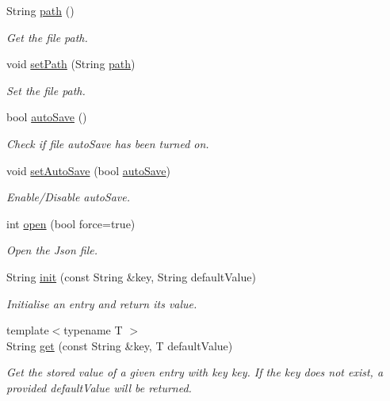 \begin{DoxyCompactItemize}
String \mbox{\hyperlink{class_nv_mem_json_file_dict_a9cf7220ebdf23d391790506e165e14d7}{path}} ()
\begin{DoxyCompactList}\small\item\em Get the file path. \end{DoxyCompactList}\item 
void \mbox{\hyperlink{class_nv_mem_json_file_dict_a7b4c2899c4ed3cf1e33d69cbec83efe7}{set\+Path}} (String \mbox{\hyperlink{class_nv_mem_json_file_dict_a9cf7220ebdf23d391790506e165e14d7}{path}})
\begin{DoxyCompactList}\small\item\em Set the file path. \end{DoxyCompactList}\item 
bool \mbox{\hyperlink{class_nv_mem_json_file_dict_aa021fe277e0529adef47b80f82864f65}{auto\+Save}} ()
\begin{DoxyCompactList}\small\item\em Check if file auto\+Save has been turned on. \end{DoxyCompactList}\item 
void \mbox{\hyperlink{class_nv_mem_json_file_dict_a4896c91e42b5d444825417850e2f0f90}{set\+Auto\+Save}} (bool \mbox{\hyperlink{class_nv_mem_json_file_dict_aa021fe277e0529adef47b80f82864f65}{auto\+Save}})
\begin{DoxyCompactList}\small\item\em Enable/\+Disable auto\+Save. \end{DoxyCompactList}\item 
int \mbox{\hyperlink{class_nv_mem_json_file_dict_a251c5ae54e2b2f0482e2cfc9baf8854b}{open}} (bool force=true)
\begin{DoxyCompactList}\small\item\em Open the Json file. \end{DoxyCompactList}\item 
String \mbox{\hyperlink{class_nv_mem_json_file_dict_ad3e3c8f549a873f194a0d5ff60063f39}{init}} (const String \&key, String default\+Value)
\begin{DoxyCompactList}\small\item\em Initialise an entry and return its value. \end{DoxyCompactList}\item 
{\footnotesize template$<$typename T $>$ }\\String \mbox{\hyperlink{class_nv_mem_json_file_dict_a247a229358e0530870801da4daaa717c}{get}} (const String \&key, T default\+Value)
\begin{DoxyCompactList}\small\item\em Get the stored value of a given entry with key {\ttfamily key}. If the {\ttfamily key} does not exist, a provided {\ttfamily default\+Value} will be returned. \end{DoxyCompactList}\item 

\end{DoxyCompactItemize}
